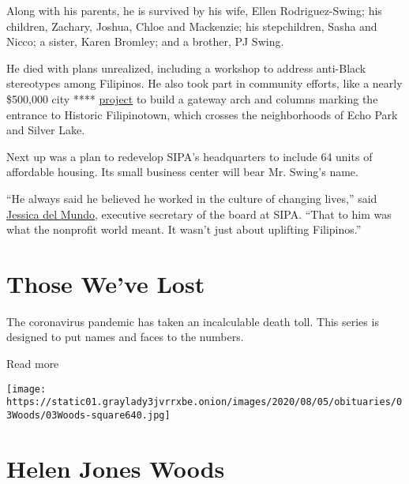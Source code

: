 Along with his parents, he is survived by his wife, Ellen
Rodriguez-Swing; his children, Zachary, Joshua, Chloe and Mackenzie; his
stepchildren, Sasha and Nicco; a sister, Karen Bromley; and a brother,
PJ Swing.

He died with plans unrealized, including a workshop to address
anti-Black stereotypes among Filipinos. He also took part in community
efforts, like a nearly \$500,000 city ****
\href{https://www.theeastsiderla.com/neighborhoods/historic_filipinotown/plans-unveiled-for-452-000-gateway-to-historic-filipinotown/article_096736f6-ad28-11ea-8a45-d34c6d8d6822.html\#:~:text=\%22Historic\%20Filipinotown\%20will\%20have\%20a,\%2C\%22\%20O'Farrell\%20said.\&text=Designed\%20by\%20Filipino\%20artist\%20Eliseo,Gabay\%3A\%20Our\%20Guiding\%20Star.\%E2\%80\%9D}{project}
to build a gateway arch and columns marking the entrance to Historic
Filipinotown, which crosses the neighborhoods of Echo Park and Silver
Lake.

Next up was a plan to redevelop SIPA's headquarters to include 64 units
of affordable housing. Its small business center will bear Mr. Swing's
name.

``He always said he believed he worked in the culture of changing
lives,'' said \href{https://sipacares.org/about/board/}{Jessica del
Mundo}, executive secretary of the board at SIPA. ``That to him was what
the nonprofit world meant. It wasn't just about uplifting Filipinos.''

\href{https://www.nytimes3xbfgragh.onion/interactive/2020/obituaries/people-died-coronavirus-obituaries.html?action=click\&pgtype=Article\&state=default\&region=BELOW_MAIN_CONTENT\&context=covid_obits_promo}{}

\hypertarget{those-weve-lost}{%
\section{Those We've Lost}\label{those-weve-lost}}

The coronavirus pandemic has taken an incalculable death toll. This
series is designed to put names and faces to the numbers.

Read more

\texttt{[image: https://static01.graylady3jvrrxbe.onion/images/2020/08/05/obituaries/03Woods/03Woods-square640.jpg]}

\hypertarget{helen-jones-woods}{%
\section{Helen Jones Woods}\label{helen-jones-woods}}

